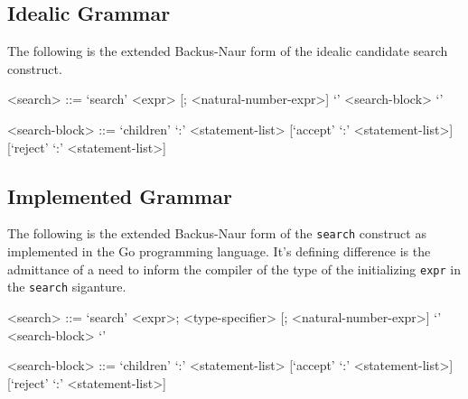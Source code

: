 \documentclass[runningheads]{llncs}
\newcommand{\code}[1]{\texttt{#1}}
\begin{document}
\subsection{Idealic Grammar}
The following is the extended Backus-Naur form of the idealic candidate search construct.
\begin{grammar}
<search> ::= `search' <expr> [; <natural-number-expr>] `{' <search-block> `}'

<search-block> ::= `children' `:' <statement-list> [`accept' `:' <statement-list>][`reject' `:' <statement-list>]
\end{grammar}

\subsection{Implemented Grammar}
The following is the extended Backus-Naur form of the \code{search} construct as implemented in the Go programming language. It's defining difference is the admittance of a need to inform the compiler of the type of the initializing \code{expr} in the \code{search} siganture.

\begin{grammar}
<search> ::= `search' <expr>; <type-specifier> [; <natural-number-expr>] `{' <search-block> `}'

<search-block> ::= `children' `:' <statement-list> [`accept' `:' <statement-list>][`reject' `:' <statement-list>]
\end{grammar}
\end{document}
